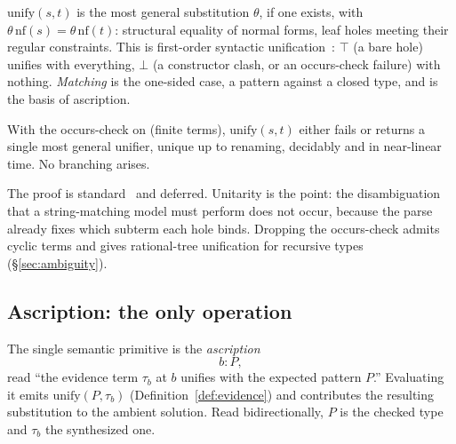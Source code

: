 \begin{definition}[Unification]
  \label{def:match}
  $\mathrm{unify}(s, t)$ is the most general substitution $\theta$, if one
  exists, with $\theta\,\mathrm{nf}(s) = \theta\,\mathrm{nf}(t)$: structural
  equality of normal forms, leaf holes meeting their regular constraints. This is
  first-order syntactic unification~\cite{robinson1965,martelli1982}: $\top$ (a
  bare hole) unifies with everything, $\bot$ (a constructor clash, or an
  occurs-check failure) with nothing. \emph{Matching} is the one-sided case, a
  pattern against a closed type, and is the basis of ascription.
\end{definition}

\begin{lemma}
  \label{lem:match-finite}
  With the occurs-check on (finite terms), $\mathrm{unify}(s, t)$ either fails or
  returns a single most general unifier, unique up to renaming, decidably and in
  near-linear time. No branching arises.
\end{lemma}

\noindent The proof is standard~\cite{martelli1982} and deferred. Unitarity is
the point: the disambiguation that a string-matching model must perform does not
occur, because the parse already fixes which subterm each hole binds. Dropping
the occurs-check admits cyclic terms and gives rational-tree unification for
recursive types (\S\ref{sec:ambiguity}).

\subsection{Ascription: the only operation}

\begin{definition}[Ascription]
  \label{def:ascription}
  The single semantic primitive is the \emph{ascription}
  \[
    b : P,
  \]
  read ``the evidence term $\tau_b$ at $b$ unifies with the expected pattern
  $P$.'' Evaluating it emits $\mathrm{unify}(P, \tau_b)$
  (Definition~\ref{def:evidence}) and contributes the resulting substitution to
  the ambient solution. Read bidirectionally, $P$ is the checked type and
  $\tau_b$ the synthesized one.
\end{definition}

